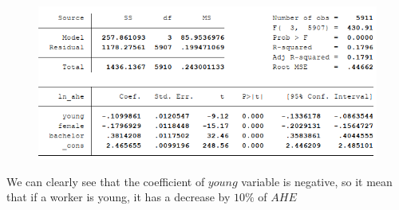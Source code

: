 \documentclass[10pt,a4paper]{article}
\begin{document}
\begin{enumerate}
	\begin{figure}[H]
		\centering
		\includegraphics[width=0.7\linewidth]{regression_young}
	\end{figure}
	We can clearly see that the coefficient of $ young $ variable is negative, so it mean that if a worker is young, it has a decrease by $ 10\% $ of $ AHE $
	\end{enumerate}
\end{document}
